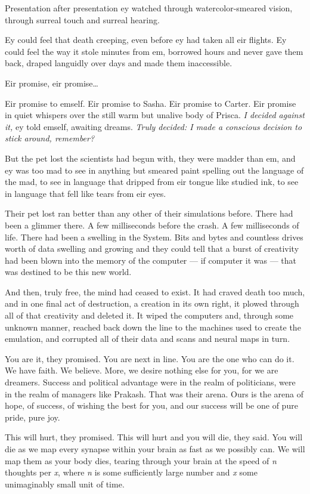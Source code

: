 Presentation after presentation ey watched through watercolor-smeared vision, through surreal touch and surreal hearing.

Ey could feel that death creeping, even before ey had taken all eir flights. Ey could feel the way it stole minutes from em, borrowed hours and never gave them back, draped languidly over days and made them inaccessible.

Eir promise, eir promise\ldots{}

Eir promise to emself. Eir promise to Sasha. Eir promise to Carter. Eir promise in quiet whispers over the still warm but unalive body of Prisca. \emph{I decided against it,} ey told emself, awaiting dreams. \emph{Truly decided: I made a conscious decision to stick around, remember?}

But the pet lost the scientists had begun with, they were madder than em, and ey was too mad to see in anything but smeared paint spelling out the language of the mad, to see in language that dripped from eir tongue like studied ink, to see in language that fell like tears from eir eyes.

Their pet lost ran better than any other of their simulations before. There had been a glimmer there. A few milliseconds before the crash. A few milliseconds of life. There had been a swelling in the System. Bits and bytes and countless drives worth of data swelling and growing and they could tell that a burst of creativity had been blown into the memory of the computer — if computer it was — that was destined to be this new world.

And then, truly free, the mind had ceased to exist. It had craved death too much, and in one final act of destruction, a creation in its own right, it plowed through all of that creativity and deleted it. It wiped the computers and, through some unknown manner, reached back down the line to the machines used to create the emulation, and corrupted all of their data and scans and neural maps in turn.

You are it, they promised. You are next in line. You are the one who can do it. We have faith. We believe. More, we desire nothing else for you, for we are dreamers. Success and political advantage were in the realm of politicians, were in the realm of managers like Prakash. That was their arena. Ours is the arena of hope, of success, of wishing the best for you, and our success will be one of pure pride, pure joy.

This will hurt, they promised. This will hurt and you will die, they said. You will die as we map every synapse within your brain as fast as we possibly can. We will map them as your body dies, tearing through your brain at the speed of \emph{n} thoughts per \emph{x}, where \emph{n} is some sufficiently large number and \emph{x} some unimaginably small unit of time.


